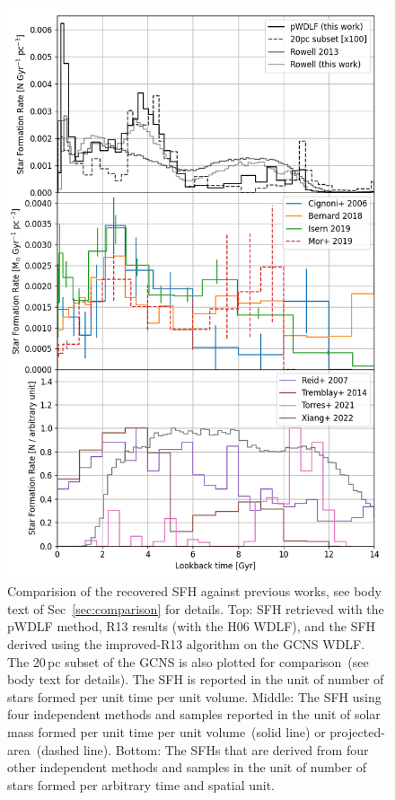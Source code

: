 \documentclass[fleqn,usenatbib]{mnras}
\begin{document}
\begin{figure}
  \includegraphics[width=\columnwidth]{figures/fig_08_compare_sfh.png}
  \caption{Comparision of the recovered SFH against previous works, see body
  text of Sec~\ref{sec:comparison} for details. Top: SFH retrieved with the
  pWDLF method, R13 results (with the H06 WDLF), and the SFH derived using the
  improved-R13 algorithm on the GCNS WDLF. The 20\,pc subset of the GCNS is
  also plotted for comparison~(see body text for details). The SFH is reported
  in the unit of number of stars formed per unit time per unit volume.
  Middle: The SFH using four independent methods and samples reported in the
  unit of solar mass formed per unit time per unit volume~(solid line) or
  projected-area~(dashed line). Bottom: The SFHs that are derived from four
  other independent methods and samples in the unit of number of stars formed
  per arbitrary time and spatial unit.}
  \label{fig:comparison}
\end{figure}
\end{document}
